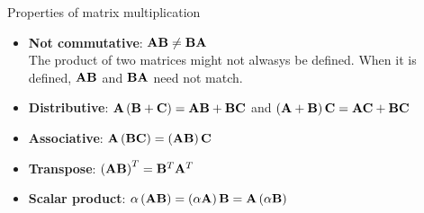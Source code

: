 \documentclass[aspectratio=169]{beamer}
\def\mf{\ensuremath\mathbf}
\begin{document}
\begin{frame}[t]{Properties of matrix multiplication}
\begin{itemize}
\item \textbf{Not commutative}: $\mf{A}\mf{B} \neq \mf{B}\mf{A}$\\
The product of two matrices might not alwasys be defined. When it is defined, $\mf{A}\mf{B}$ and $\mf{B}\mf{A}$ need not match.
\item \textbf{Distributive}:  $\mf{A}\left(\mf{B} + \mf{C}\right) = \mf{A}\mf{B} + \mf{B}\mf{C}$ and $\left(\mf{A} + \mf{B}\right)\mf{C} = \mf{A}\mf{C} + \mf{B}\mf{C}$ 
\item \textbf{Associative}: $\mf{A}\left(\mf{B}\mf{C}\right) = \left(\mf{A}\mf{B}\right)\mf{C} $
\item \textbf{Transpose}: $\left(\mf{A}\mf{B}\right)^T = \mf{B}^T\mf{A}^T$
\item \textbf{Scalar product}: $\alpha\left(\mf{A}\mf{B}\right) = \left(\alpha \mf{A}\right)\mf{B} = \mf{A}\left(\alpha \mf{B}\right)$
\end{itemize}
\end{frame}
\end{document}
